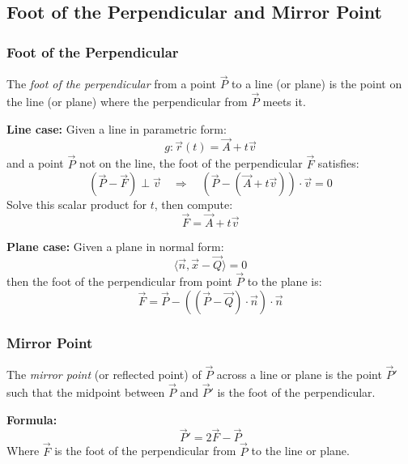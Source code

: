 \subsection{Foot of the Perpendicular and Mirror Point}

\subsubsection*{Foot of the Perpendicular}

The \emph{foot of the perpendicular} from a point \(\vec{P}\) to a line (or plane) is the point on the line (or plane) where the perpendicular from \(\vec{P}\) meets it.

\textbf{Line case:}
Given a line in parametric form:
\[
	g: \vec{r}(t) = \vec{A} + t\vec{v}
\]
and a point \(\vec{P}\) not on the line, the foot of the perpendicular \(\vec{F}\) satisfies:
\[
	(\vec{P} - \vec{F}) \perp \vec{v} \quad \Rightarrow \quad (\vec{P} - (\vec{A} + t\vec{v})) \cdot \vec{v} = 0
\]
Solve this scalar product for \(t\), then compute:
\[
	\vec{F} = \vec{A} + t\vec{v}
\]

\textbf{Plane case:}
Given a plane in normal form:
\[
	\langle \vec{n}, \vec{x} - \vec{Q} \rangle = 0
\]
then the foot of the perpendicular from point \(\vec{P}\) to the plane is:
\[
	\vec{F} = \vec{P} - ((\vec{P} - \vec{Q}) \cdot \vec{n}) \cdot \vec{n}
\]

\subsubsection*{Mirror Point}

The \emph{mirror point} (or reflected point) of \(\vec{P}\) across a line or plane is the point \(\vec{P}'\) such that the midpoint between \(\vec{P}\) and \(\vec{P}'\) is the foot of the perpendicular.

 \textbf{Formula:}
\[
	\vec{P}' = 2\vec{F} - \vec{P}
\]
Where \(\vec{F}\) is the foot of the perpendicular from \(\vec{P}\) to the line or plane.

\newpage
